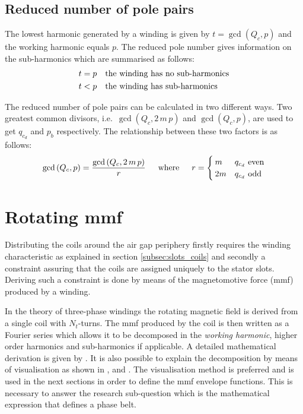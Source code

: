 \subsection{Reduced number of pole pairs}
The lowest harmonic generated by a winding is given by $t=\gcd\left(Q_c,p\right)$ and the working harmonic equals $p$. The reduced pole number gives information on the sub-harmonics which are summarised as follows:
\begin{equation}	
 \begin{aligned}
	t &= p \quad \textnormal{the winding has no sub-harmonics} \\
	t &< p \quad \textnormal{the winding has sub-harmonics}
	\end{aligned}
\end{equation} 

The reduced number of pole pairs can be calculated in two different ways. Two greatest common divisors, i.e.~$\gcd\left(Q_c,2\,m\,p\right)$ and $\gcd\left(Q_c,p\right)$, are used to get $q_{c_d}$ and $p_b$ respectively. The relationship between these two factors is as follows:
\begin{equation}
  \label{eqn:reduced_p} 
  \gcd\left(Q_c,p\right)=\frac{\gcd\left(Q_c,2\,m\,p\right)}{r} \hspace{15pt}
  \textnormal{where} \hspace{15pt} r=
  \begin{cases}
	 m  & \text{$q_{c_d}$ even}\\
	 2m & \text{$q_{c_d}$ odd}
  \end{cases}
\end{equation}

\section{Rotating mmf}
Distributing the coils around the air gap periphery firstly requires the winding characteristic as explained in section \ref{subsec:slots_coils} and secondly a constraint assuring that the coils are assigned uniquely to the stator slots. Deriving such a constraint is done by means of the magnetomotive force (mmf) produced by a winding. 

In the theory of three-phase windings the rotating magnetic field is derived from a single coil with $N_t$-turns. The mmf produced by the coil is then written as a Fourier series which allows it to be decomposed in the \textit{working harmonic}, higher order harmonics and sub-harmonics if applicable. A detailed mathematical derivation is given by \cite{REF-01043}. It is also possible to explain the decomposition by means of visualisation as shown in \cite{REF-00004}, \cite{REF-00294} and  \cite{REF-00330}. The visualisation method is preferred and is used in the next sections in order to define the mmf envelope functions. This is necessary to answer the research sub-question which is the mathematical expression that defines a phase belt.

